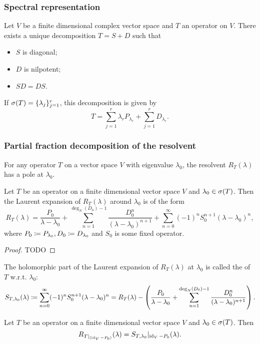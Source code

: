 \subsubsection{Spectral representation}
\begin{proposition}
Let $V$ be a finite dimensional complex vector space and $T$ an operator on $V$. There exists a unique decomposition $T = S + D$ such that
\begin{itemize}
\item $S$ is diagonal;
\item $D$ is nilpotent;
\item $SD = DS$.
\end{itemize}
If $\sigma(T) = \{\lambda_j\}_{j=1}^r$, this decomposition is given by
\[ T = \sum_{j=1}^r \lambda_r P_{\lambda_r} + \sum_{j=1}^r D_{\lambda_r}. \]
\end{proposition}

\subsubsection{Partial fraction decomposition of the resolvent}
For any operator $T$ on a vector space $V$ with eigenvalue $\lambda_0$, the resolvent $R_T(\lambda)$ has a pole at $\lambda_0$.

\begin{proposition}
Let $T$ be an operator on a finite dimensional vector space $V$ and $\lambda_0\in\sigma(T)$. Then the Laurent expansion of $R_T(\lambda)$ around $\lambda_0$ is of the form
\[ R_T(\lambda) = \frac{P_0}{\lambda-\lambda_0} + \sum_{n=1}^{\deg_N(D_0)-1}\frac{D_0^{n}}{(\lambda - \lambda_0)^{n+1}} + \sum_{n=0}^\infty(-1)^n S_0^{n+1}(\lambda - \lambda_0)^n, \]
where $P_0\coloneqq P_{\lambda_0}, D_0\coloneqq D_{\lambda_0}$ and $S_0$ is some fixed operator.
\end{proposition}
\begin{proof}
TODO
\end{proof}

\begin{definition}
The holomorphic part of the Laurent expansion of $R_T(\lambda)$ at $\lambda_0$ is called the  of $T$ w.r.t. $\lambda_0$:
\[ S_{T,\lambda_0}(\lambda) \coloneqq \sum_{n=0}^\infty(-1)^n S_0^{n+1}(\lambda - \lambda_0)^n = R_T(\lambda) - \left(\frac{P_0}{\lambda-\lambda_0} + \sum_{n=1}^{\deg_N(D_0)-1}\frac{D_0^{n}}{(\lambda - \lambda_0)^{n+1}}\right). \]
\end{definition}

\begin{proposition}
Let $T$ be an operator on a finite dimensional vector space $V$ and $\lambda_0\in\sigma(T)$. Then
\[ R_{T|_{(\operatorname{id}_V-P_0)}}(\lambda) = S_{T,\lambda_0}|_{\operatorname{id}_V-P_0}(\lambda). \]
\end{proposition}

